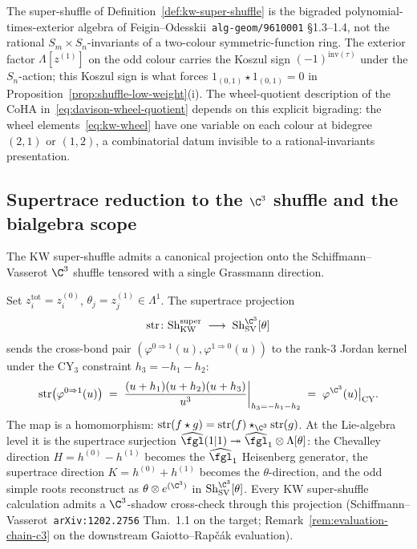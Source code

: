 \begin{remark}
\label{rem:kw-bigrading}
The super-shuffle of Definition~\ref{def:kw-super-shuffle} is the bigraded polynomial-times-exterior algebra of Feigin--Odesskii~\texttt{alg-geom/9610001} \S1.3--1.4, not the rational $S_m \times S_n$-invariants of a two-colour symmetric-function ring. The exterior factor $\Lambda[z^{(1)}]$ on the odd colour carries the Koszul sign $(-1)^{\mathrm{inv}(\tau)}$ under the $S_n$-action; this Koszul sign is what forces $1_{(0,1)} \star 1_{(0,1)} = 0$ in Proposition~\ref{prop:shuffle-low-weight}\textup{(i)}. The wheel-quotient description of the CoHA in~\eqref{eq:davison-wheel-quotient} depends on this explicit bigrading: the wheel elements~\eqref{eq:kw-wheel} have one variable on each colour at bidegree $(2,1)$ or $(1,2)$, a combinatorial datum invisible to a rational-invariants presentation.
\end{remark}

\subsection{Supertrace reduction to the $\C^3$ shuffle and the bialgebra scope}
\label{subsec:kw-supertrace}

The KW super-shuffle admits a canonical projection onto the Schiffmann--Vasserot $\C^3$ shuffle tensored with a single Grassmann direction.

\begin{proposition}
\label{prop:kw-supertrace}
Set $z^{\mathrm{tot}}_i = z^{(0)}_i$, $\theta_j = z^{(1)}_j \in \Lambda^1$. The supertrace projection
\[
 \mathrm{str} \colon
 \mathrm{Sh}^{\mathrm{super}}_{\mathrm{KW}}
 \;\longrightarrow\;
 \mathrm{Sh}^{\C^3}_{\mathrm{SV}}[\theta]
\]
sends the cross-bond pair $(\varphi^{0 \Rightarrow 1}(u), \varphi^{1 \Rightarrow 0}(u))$ to the rank-$3$ Jordan kernel under the CY$_3$ constraint $h_3 = -h_1 - h_2$:
\[
 \mathrm{str}\bigl(\varphi^{0 \Rightarrow 1}(u)\bigr)
 \;=\; \frac{(u + h_1)(u + h_2)(u + h_3)}{u^3}\bigg|_{h_3 = -h_1 - h_2}
 \;=\; \varphi^{\C^3}(u)\big|_{\mathrm{CY}}.
\]
The map is a homomorphism: $\mathrm{str}(f \star g) = \mathrm{str}(f) \star_{\C^3} \mathrm{str}(g)$. At the Lie-algebra level it is the supertrace surjection $\widehat{\fgl}(1|1) \twoheadrightarrow \widehat{\fgl}_1 \otimes \Lambda[\theta]$: the Chevalley direction $H = h^{(0)} - h^{(1)}$ becomes the $\widehat{\fgl}_1$ Heisenberg generator, the supertrace direction $K = h^{(0)} + h^{(1)}$ becomes the $\theta$-direction, and the odd simple roots reconstruct as $\theta \otimes e^{(\C^3)}$ in $\mathrm{Sh}^{\C^3}_{\mathrm{SV}}[\theta]$. Every KW super-shuffle calculation admits a $\C^3$-shadow cross-check through this projection (Schiffmann--Vasserot~\texttt{arXiv:1202.2756} Thm.~1.1 on the target; Remark~\ref{rem:evaluation-chain-c3} on the downstream Gaiotto--Rap\v{c}\'ak evaluation).
\end{proposition}

